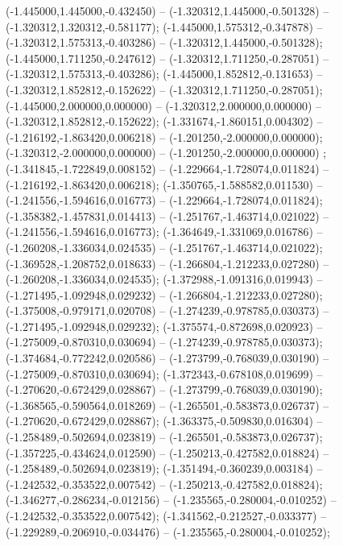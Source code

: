  (-1.445000,1.445000,-0.432450) -- (-1.320312,1.445000,-0.501328) -- (-1.320312,1.320312,-0.581177);
 (-1.445000,1.575312,-0.347878) -- (-1.320312,1.575313,-0.403286) -- (-1.320312,1.445000,-0.501328);
 (-1.445000,1.711250,-0.247612) -- (-1.320312,1.711250,-0.287051) -- (-1.320312,1.575313,-0.403286);
 (-1.445000,1.852812,-0.131653) -- (-1.320312,1.852812,-0.152622) -- (-1.320312,1.711250,-0.287051);
 (-1.445000,2.000000,0.000000) -- (-1.320312,2.000000,0.000000) -- (-1.320312,1.852812,-0.152622);
 (-1.331674,-1.860151,0.004302) -- (-1.216192,-1.863420,0.006218) -- (-1.201250,-2.000000,0.000000);
 (-1.320312,-2.000000,0.000000) -- (-1.201250,-2.000000,0.000000) ;
 (-1.341845,-1.722849,0.008152) -- (-1.229664,-1.728074,0.011824) -- (-1.216192,-1.863420,0.006218);
 (-1.350765,-1.588582,0.011530) -- (-1.241556,-1.594616,0.016773) -- (-1.229664,-1.728074,0.011824);
 (-1.358382,-1.457831,0.014413) -- (-1.251767,-1.463714,0.021022) -- (-1.241556,-1.594616,0.016773);
 (-1.364649,-1.331069,0.016786) -- (-1.260208,-1.336034,0.024535) -- (-1.251767,-1.463714,0.021022);
 (-1.369528,-1.208752,0.018633) -- (-1.266804,-1.212233,0.027280) -- (-1.260208,-1.336034,0.024535);
 (-1.372988,-1.091316,0.019943) -- (-1.271495,-1.092948,0.029232) -- (-1.266804,-1.212233,0.027280);
 (-1.375008,-0.979171,0.020708) -- (-1.274239,-0.978785,0.030373) -- (-1.271495,-1.092948,0.029232);
 (-1.375574,-0.872698,0.020923) -- (-1.275009,-0.870310,0.030694) -- (-1.274239,-0.978785,0.030373);
 (-1.374684,-0.772242,0.020586) -- (-1.273799,-0.768039,0.030190) -- (-1.275009,-0.870310,0.030694);
 (-1.372343,-0.678108,0.019699) -- (-1.270620,-0.672429,0.028867) -- (-1.273799,-0.768039,0.030190);
 (-1.368565,-0.590564,0.018269) -- (-1.265501,-0.583873,0.026737) -- (-1.270620,-0.672429,0.028867);
 (-1.363375,-0.509830,0.016304) -- (-1.258489,-0.502694,0.023819) -- (-1.265501,-0.583873,0.026737);
 (-1.357225,-0.434624,0.012590) -- (-1.250213,-0.427582,0.018824) -- (-1.258489,-0.502694,0.023819);
 (-1.351494,-0.360239,0.003184) -- (-1.242532,-0.353522,0.007542) -- (-1.250213,-0.427582,0.018824);
 (-1.346277,-0.286234,-0.012156) -- (-1.235565,-0.280004,-0.010252) -- (-1.242532,-0.353522,0.007542);
 (-1.341562,-0.212527,-0.033377) -- (-1.229289,-0.206910,-0.034476) -- (-1.235565,-0.280004,-0.010252);
